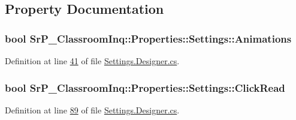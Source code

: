 \subsection{\-Property \-Documentation}
\hypertarget{class_sr_p___classroom_inq_1_1_properties_1_1_settings_ab4e4d47d4289ea293aa6c3176ef7ba39}{
\subsubsection[{\-Animations}]{\setlength{\rightskip}{0pt plus 5cm}bool \-Sr\-P\-\_\-\-Classroom\-Inq\-::\-Properties\-::\-Settings\-::\-Animations}}
\label{class_sr_p___classroom_inq_1_1_properties_1_1_settings_ab4e4d47d4289ea293aa6c3176ef7ba39}


\-Definition at line \hyperlink{_settings_8_designer_8cs_source_l00041}{41} of file \hyperlink{_settings_8_designer_8cs_source}{\-Settings.\-Designer.\-cs}.

\hypertarget{class_sr_p___classroom_inq_1_1_properties_1_1_settings_af45458c33afb096610d416c61ac86e16}{
\subsubsection[{\-Click\-Read}]{\setlength{\rightskip}{0pt plus 5cm}bool \-Sr\-P\-\_\-\-Classroom\-Inq\-::\-Properties\-::\-Settings\-::\-Click\-Read}}
\label{class_sr_p___classroom_inq_1_1_properties_1_1_settings_af45458c33afb096610d416c61ac86e16}


\-Definition at line \hyperlink{_settings_8_designer_8cs_source_l00089}{89} of file \hyperlink{_settings_8_designer_8cs_source}{\-Settings.\-Designer.\-cs}.

